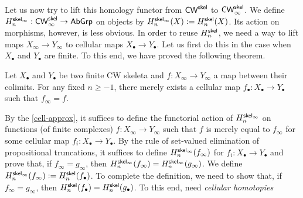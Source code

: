 \documentclass[a4page]{article}
\begin{document}
Let us now try to lift this homology functor from
$\textnormal{\ensuremath{\mathsf{CW}^{\mathsf{skel}}}}$ to
$\textnormal{\ensuremath{\mathsf{CW}_\infty^{\mathsf{skel}}}}$. We define
$\textnormal{\ensuremath{H^{\mathsf{skel}_\infty}_{n}}} : \textnormal{\ensuremath{\mathsf{CW}_\infty^{\mathsf{skel}}}} \to
\textnormal{\ensuremath{\mathsf{AbGrp}}}$ on objects by $\textnormal{\ensuremath{H^{\mathsf{skel}_\infty}_{n}}}(X) :=
H_n^{\mathsf{skel}}(X)$. Its action on morphisms, however, is
less obvious. In order to reuse $\textnormal{\ensuremath{H^{\mathsf{skel}}_{n}}}$, we need a way to lift maps $X_\infty \to Y_\infty$ to cellular maps $X_\bullet \to Y_\bullet$. Let us first do this in the case when $X_\bullet$ and $Y_\bullet$ are finite. To this end, we have proved the following theorem.
%
\begin{theorem}\label{cell-approx}
  Let $X_\bullet$ and $Y_\bullet$ be two finite CW skeleta and $f : X_{\infty} \to Y_{\infty}$ a map between their colimits. For any fixed $n \geq -1$, there merely exists a cellular map $f_\bullet : X_\bullet \to Y_\bullet$ such that $f_\infty = f$.
\end{theorem}
By the \cref{cell-approx}, it suffices to define the functorial action of $\textnormal{\ensuremath{H^{\mathsf{skel}_\infty}_{n}}}$ on functions (of finite complexes) $f : X_\infty \to Y_\infty$ such that $f$ is merely equal to $f_\infty$ for some cellular map $f_i : X_\bullet \to Y_\bullet$. By the rule of set-valued elimination of propositional truncations, it suffices to define $\textnormal{\ensuremath{H^{\mathsf{skel}_\infty}_{n}}}(f_\infty)$ for $f_i : X_\bullet \to Y_\bullet$ and prove that, if $f_\infty = g_\infty$, then $\textnormal{\ensuremath{H^{\mathsf{skel}_\infty}_{n}}}(f_\infty) = \textnormal{\ensuremath{H^{\mathsf{skel}_\infty}_{n}}}(g_\infty)$. We define $\textnormal{\ensuremath{H^{\mathsf{skel}_\infty}_{n}}}(f_\infty) := \textnormal{\ensuremath{H^{\mathsf{skel}}_{n}}}(f_\bullet)$. To complete the definition, we need to show that, if $f_\infty = g_\infty$, then $\textnormal{\ensuremath{H^{\mathsf{skel}}_{n}}}(f_\bullet) = \textnormal{\ensuremath{H^{\mathsf{skel}}_{n}}}(g_\bullet)$. To this end, need \emph{cellular homotopies}
\end{document}
